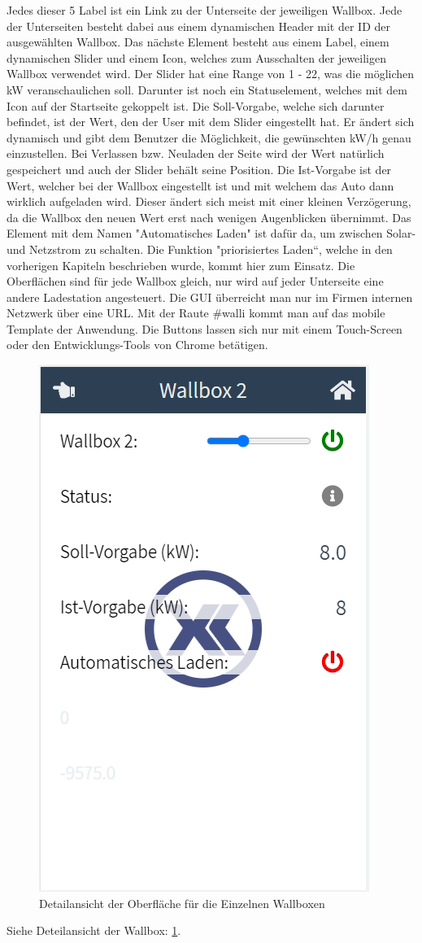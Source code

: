 Jedes dieser 5 Label ist ein Link zu der Unterseite der jeweiligen Wallbox. Jede der Unterseiten besteht dabei aus einem dynamischen Header mit der ID der ausgewählten Wallbox. Das nächste Element besteht aus einem Label, einem dynamischen Slider und einem Icon, welches zum Ausschalten der jeweiligen Wallbox verwendet wird. Der Slider hat eine Range von 1 - 22, was die möglichen kW veranschaulichen soll. Darunter ist noch ein Statuselement, welches mit dem Icon auf der Startseite gekoppelt ist. Die Soll-Vorgabe, welche sich darunter befindet, ist der Wert, den der User mit dem Slider eingestellt hat. Er ändert sich dynamisch und gibt dem Benutzer die Möglichkeit, die gewünschten kW/h genau einzustellen. Bei Verlassen bzw. Neuladen der Seite wird der Wert natürlich gespeichert und auch der Slider behält seine Position. Die Ist-Vorgabe ist der Wert, welcher bei der Wallbox eingestellt ist und mit welchem das Auto dann wirklich aufgeladen wird. Dieser ändert sich meist mit einer kleinen Verzögerung, da die Wallbox den neuen Wert erst nach wenigen Augenblicken übernimmt. Das Element mit dem Namen "Automatisches Laden" ist dafür da, um zwischen Solar- und Netzstrom zu schalten. Die Funktion "priorisiertes Laden“, welche in den vorherigen Kapiteln beschrieben wurde, kommt hier zum Einsatz. Die Oberflächen sind für jede Wallbox gleich, nur wird auf jeder Unterseite eine andere Ladestation angesteuert. Die GUI überreicht man nur im Firmen internen Netzwerk über eine URL. Mit der Raute \#walli kommt man auf das mobile Template der Anwendung. Die Buttons lassen sich nur mit einem Touch-Screen oder den Entwicklungs-Tools von Chrome betätigen. 


\begin{figure}[h t]
  \centering
  \includegraphics[scale=0.5]{pics/DetailansichtWallbox2.png}
  \caption{Detailansicht der Oberfläche für die Einzelnen Wallboxen }
  \label{fig:impl:HMIWallboxDetail}
\end{figure}

Siehe Deteilansicht der Wallbox: \ref{fig:impl:HMIWallboxDetail}.

